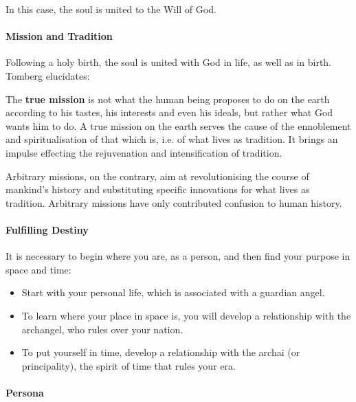 In this case, the soul is united to the Will of God.

\paragraph{Mission and Tradition}


Following a holy birth, the soul is united with God in life, as well as in birth. Tomberg elucidates:

\begin{quotex}
The \textbf{true mission} is not what the human being proposes to do on the earth according to his tastes, his interests and even his ideals, but rather what God wants him to do. A true mission on the earth serves the cause of the ennoblement and spiritualisation of that which is, i.e. of what lives as tradition. It brings an impulse effecting the rejuvenation and intensification of tradition.
\end{quotex}


Arbitrary missions, on the contrary, aim at revolutionising the course of mankind's history and substituting specific innovations for what lives as tradition. Arbitrary missions have only contributed confusion to human history.

\paragraph{Fulfilling Destiny}


It is necessary to begin where you are, as a person, and then find your purpose in space and time:

\begin{itemize}


\item Start with your personal life, which is associated with a guardian angel.

\item To learn where your place in space is, you will develop a relationship with the archangel, who rules over your nation.

\item To put yourself in time, develop a relationship with the archai (or principality), the spirit of time that rules your era.
\end{itemize}


\paragraph{Persona}


